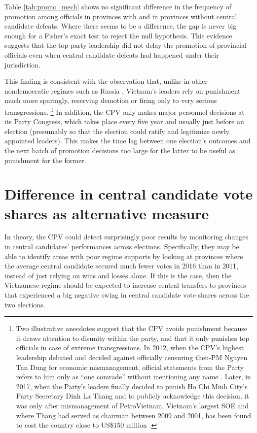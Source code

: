 \documentclass[12pt]{article}
\newcommand\fnote[1]{\footnote{\baselineskip=2\normalbaselineskip#1}}
\newcommand{\1}{\mathbbm{1}}
\begin{document}


Table \ref{tab:promo_mech} shows no significant difference in the frequency of promotion among officials in provinces with and in provinces without central candidate defeats. Where there seems to be a difference, the gap is never big enough for a Fisher's exact test to reject the null hypothesis. This evidence suggests that the top party leadership did not delay the promotion of provincial officials even when central candidate defeats had happened under their jurisdiction.

This finding is consistent with the observation that, unlike in other nondemocratic regimes such as Russia \citep{Myagkov2009}, Vietnam's leaders rely on punishment much more sparingly, reserving demotion or firing only to very serious transgressions. \fnote{Two illustrative anecdotes suggest that the CPV avoids punishment because it draws attention to disunity within the party, and that it only punishes top officials in case of extreme transgressions. In 2012, when the CPV's highest leadership debated and decided against officially censuring then-PM Nguyen Tan Dung for economic mismanagement, official statements from the Party refers to him only as ``one comrade'' without mentioning any name \citep{voa2012}. Later, in 2017, when the Party's leaders finally decided to punish Ho Chi Minh City's Party Secretary Dinh La Thang and to publicly acknowledge this decision, it was only after mismanagement of PetroVietnam, Vietnam's largest SOE and where Thang had served as chairman between 2009 and 2001, has been found to cost the country close to US\$150 million \citep{BBC2017}.} In addition, the CPV only makes major personnel decisions at its Party Congress, which takes place every five year and usually just before an election (presumably so that the election could ratify and legitimize newly appointed leaders). This makes the time lag between one election's outcomes and the next batch of promotion decisions too large for the latter to be useful as punishment for the former.

\section{Difference in central candidate vote shares as alternative measure}
\label{app:share_dif}

In theory, the CPV could detect surprisingly poor results by monitoring changes in central candidates' performances across elections. Specifically, they may be able to identify areas with poor regime supports by looking at provinces where the average central candidate secured much fewer votes in 2016 than in 2011, instead of just relying on wins and losses alone. If this is the case, then the Vietnamese regime should be expected to increase central transfers to provinces that experienced a big negative swing in central candidate vote shares across the two elections.
\end{document}
